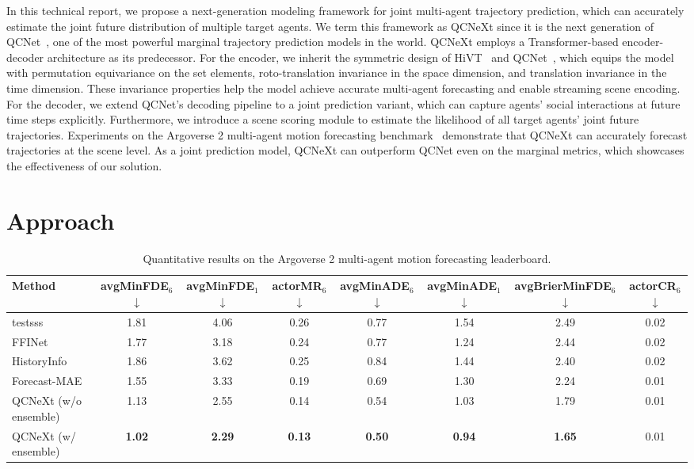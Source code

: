 \documentclass[10pt,twocolumn,letterpaper]{article}
\begin{document}
In this technical report, we propose a next-generation modeling framework for joint multi-agent trajectory prediction, which can accurately estimate the joint future distribution of multiple target agents. We term this framework as QCNeXt since it is the next generation of QCNet~\cite{zhou2023query}, one of the most powerful marginal trajectory prediction models in the world. QCNeXt employs a Transformer-based encoder-decoder architecture as its predecessor. For the encoder, we inherit the symmetric design of HiVT~\cite{zhou2022hivt} and QCNet~\cite{zhou2023query}, which equips the model with permutation equivariance on the set elements, roto-translation invariance in the space dimension, and translation invariance in the time dimension. These invariance properties help the model achieve accurate multi-agent forecasting and enable streaming scene encoding. For the decoder, we extend QCNet's decoding pipeline to a joint prediction variant, which can capture agents' social interactions at future time steps explicitly. Furthermore, we introduce a scene scoring module to estimate the likelihood of all target agents' joint future trajectories. Experiments on the Argoverse 2 multi-agent motion forecasting benchmark~\cite{Argoverse2} demonstrate that QCNeXt can accurately forecast trajectories at the scene level. As a joint prediction model, QCNeXt can outperform QCNet even on the marginal metrics, which showcases the effectiveness of our solution.

\section{Approach}

\begin{table}[t]
\footnotesize
\centering
\setlength{\tabcolsep}{1.4mm}
\begin{tabular}{lccccccc}
\toprule
Method & avgMinFDE${}_6$ $\downarrow$ & avgMinFDE${}_1$ $\downarrow$ & actorMR${}_6$ $\downarrow$ & avgMinADE${}_6$ $\downarrow$ & avgMinADE${}_1$ $\downarrow$ & \textbf{avgBrierMinFDE${}_6$ $\downarrow$} & actorCR${}_6$ $\downarrow$ \\
\midrule
testsss & 1.81 & 4.06 & 0.26 & 0.77 & 1.54 & 2.49 & 0.02 \\
FFINet & 1.77 & 3.18 & 0.24 & 0.77 & 1.24 & 2.44 & 0.02 \\
HistoryInfo & 1.86 & 3.62 & 0.25 & 0.84 & 1.44 & 2.40 & 0.02 \\
Forecast-MAE & 1.55 & 3.33 & 0.19 & 0.69 & 1.30 & 2.24 & 0.01 \\
\hline
QCNeXt (w/o ensemble) & 1.13 & 2.55 & 0.14 & 0.54 & 1.03 & 1.79 & 0.01 \\
QCNeXt (w/ ensemble) & \textbf{1.02} & \textbf{2.29} & \textbf{0.13} & \textbf{0.50} & \textbf{0.94} & \textbf{1.65} & 0.01 \\
\bottomrule
\end{tabular}
\caption{Quantitative results on the Argoverse 2 multi-agent motion forecasting leaderboard.}
\label{tab:av2_joint_test}
\end{table}
\end{document}
